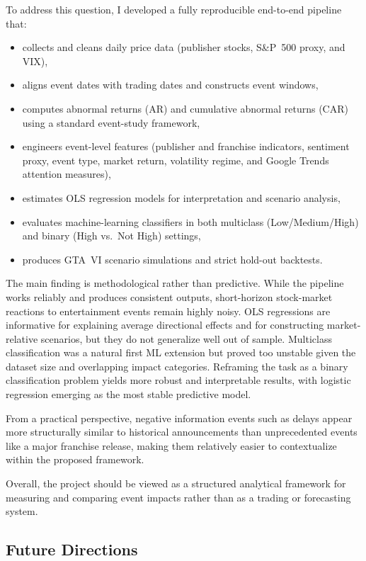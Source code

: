 \documentclass[11pt,a4paper]{article}
\begin{document}
To address this question, I developed a fully reproducible end-to-end pipeline that:
\begin{itemize}[itemsep=0pt, topsep=2pt]
    \item collects and cleans daily price data (publisher stocks, S\&P~500 proxy, and VIX),
    \item aligns event dates with trading dates and constructs event windows,
    \item computes abnormal returns (AR) and cumulative abnormal returns (CAR) using a standard event-study framework,
    \item engineers event-level features (publisher and franchise indicators, sentiment proxy, event type, market return, volatility regime, and Google Trends attention measures),
    \item estimates OLS regression models for interpretation and scenario analysis,
    \item evaluates machine-learning classifiers in both multiclass (Low/Medium/High) and binary (High vs.\ Not High) settings,
    \item produces GTA~VI scenario simulations and strict hold-out backtests.
\end{itemize}

The main finding is methodological rather than predictive. While the pipeline works reliably and produces consistent outputs, short-horizon stock-market reactions to entertainment events remain highly noisy. OLS regressions are informative for explaining average directional effects and for constructing market-relative scenarios, but they do not generalize well out of sample. Multiclass classification was a natural first ML extension but proved too unstable given the dataset size and overlapping impact categories. Reframing the task as a binary classification problem yields more robust and interpretable results, with logistic regression emerging as the most stable predictive model.

From a practical perspective, negative information events such as delays appear more structurally similar to historical announcements than unprecedented events like a major franchise release, making them relatively easier to contextualize within the proposed framework.

Overall, the project should be viewed as a structured analytical framework for measuring and comparing event impacts rather than as a trading or forecasting system.

\subsection{Future Directions}
\end{document}
